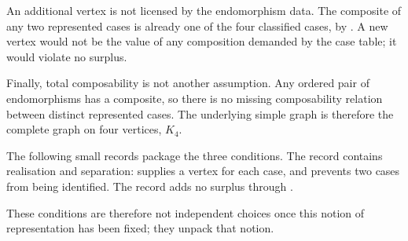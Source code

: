 \documentclass[11pt]{article}
\begin{document}
An additional vertex is not licensed by the endomorphism data.  The
composite of any two represented cases is already one of the four
classified cases, by .  A new vertex
would not be the value of any composition demanded by the case table; it
would violate no surplus.

Finally, total composability is not another assumption.  Any ordered
pair of endomorphisms has a composite, so there is no missing
composability relation between distinct represented cases.  The
underlying simple graph is therefore the complete graph on four
vertices, $K_4$.

\begin{center}
\end{center}

The following small records package the three conditions.  The record
 contains realisation and separation:
 supplies a vertex for each case, and
 prevents two cases from being identified.
The record  adds no surplus through
.

These conditions are therefore not independent choices once this notion
of representation has been fixed; they unpack that notion.
\end{document}

